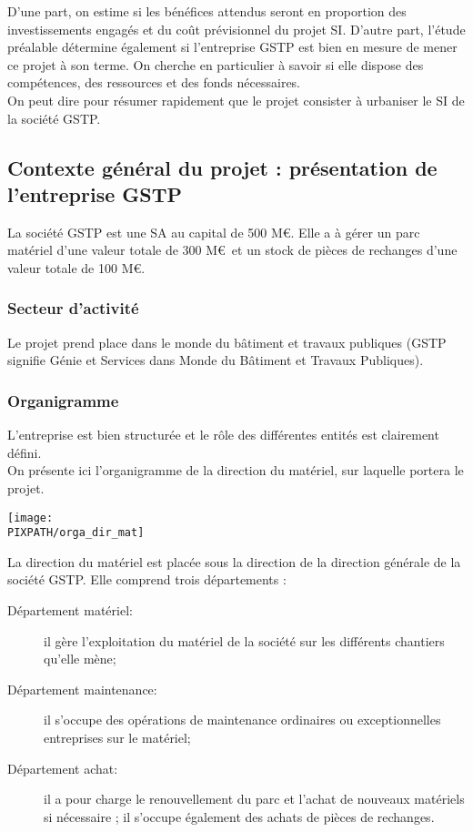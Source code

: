 \documentclass[twoside]{article}
\newcommand\PIXPATH{./docs/pics}
\begin{document}
D’une part, on estime si les bénéfices attendus seront en proportion des
investissements engagés et du coût prévisionnel du projet SI.  D’autre
part, l’étude préalable détermine également si l’entreprise GSTP est
bien en mesure de mener ce projet à son terme. On cherche en particulier
à savoir si elle dispose des compétences, des ressources et des fonds
nécessaires.\\

On peut dire pour résumer rapidement que le projet consister à urbaniser le
SI de la société GSTP.


\subsection{Contexte général du projet : présentation de l'entreprise GSTP}

La société GSTP est une SA au capital de 500 M\euro. Elle a à gérer un parc
matériel d'une valeur totale de 300 M\euro\ et un stock de pièces de
rechanges d'une valeur totale de 100 M\euro.

\subsubsection{Secteur d'activité}
Le projet prend place dans le monde du bâtiment et travaux publiques (GSTP
signifie Génie et Services dans Monde du Bâtiment et Travaux Publiques).


\subsubsection{Organigramme}
L'entreprise est bien structurée et le rôle des différentes entités est clairement défini.\\
On présente ici l'organigramme de la direction du matériel, sur laquelle
portera le projet.\\

\begin{center}
\texttt{[image: \\PIXPATH/orga\_dir\_mat]}\hfill\\
\end{center}

La direction du matériel est placée sous la direction de la direction générale
de la société GSTP. Elle comprend trois départements :\\

\begin{description}

\item[Département matériel:] il gère l'exploitation du matériel de la
société sur les différents chantiers qu'elle mène;
\item[Département maintenance:] il s'occupe des opérations de maintenance
ordinaires ou exceptionnelles entreprises sur le matériel;
\item[Département achat:] il a pour charge le renouvellement du parc et
l'achat de nouveaux matériels si nécessaire ; il s'occupe également des
achats de pièces de rechanges.

\end{description}
\end{document}
